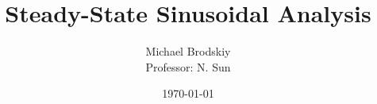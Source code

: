 


\title{Steady-State Sinusoidal Analysis}
\date{\today}
\author{Michael Brodskiy\\ \small Professor: N. Sun}



\maketitle

